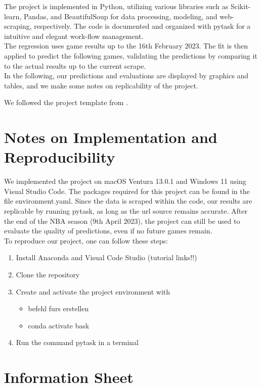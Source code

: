 \documentclass[11pt, a4paper, leqno]{article}
\begin{document}
The project is implemented in Python, utilizing various libraries such as Scikit-learn, Pandas, and BeautifulSoup for data processing, modeling, and web-scraping, respectively.
The code is documented and organized with pytask for a intuitive and elegant work-flow management.\\

The regression uses game results up to the 16th February 2023. The fit is then applied to predict the following games, validating the predictions by comparing it to the actual results up to the current scrape.\\
In the following, our predictions and evaluations are displayed by graphics and tables, and we make some notes on replicability of the project.

We followed the project template from \citet{GaudeckerEconProjectTemplates}.


\section{Notes on Implementation and Reproducibility}

We implemented the project on macOS Ventura 13.0.1 and Windows 11 using Visual Studio Code. The packages required for this project can be found in the file environment.yaml.
Since the data is scraped within the code, our results are replicable by running pytask, as long as the url source remains accurate.
After the end of the NBA season (9th April 2023), the project can still be used to evaluate the quality of predictions, even if no future games remain.\\
To reproduce our project, one can follow these steps:
\begin{enumerate}
    \item Install Anaconda and Visual Code Studio (tutorial links!!)
    \item Clone the repository
    \item Create and activate the project environment with
        \begin{itemize}
            \item befehl furs erstellen
            \item conda activate bask
        \end{itemize}
    \item Run the command pytask in a terminal
\end{enumerate}


\section{Information Sheet}
\end{document}
